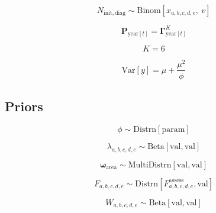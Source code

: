 \documentclass{article}
\begin{document}
\begin{equation}
  \label{eq:model-release}
  N_{\mathrm{init, diag}} \sim \mathrm{Binom} \! \left[ x_{a,b,c,d,e} \mathrm{,} \: v  \right]
\end{equation}

\begin{equation}
  \label{eq:model-movement}
  \boldsymbol{P}_{\mathrm{year}[t]} = \boldsymbol{\Gamma}^{K}_{\mathrm{year}[t]}
\end{equation}

\begin{equation}
  \label{eq:model-seasons}
  K = 6
\end{equation}

\begin{equation}
  \label{eq:model-variance}
  \mathrm{Var} \! \left[ y  \right] = \mu + \frac{\mu^2}{\phi}
\end{equation}

\subsection{Priors}

\begin{equation}
  \label{eq:prior-dispersion}
  \phi \sim \mathrm{Distrn} \! \left[ \mathrm{param} \right]
\end{equation}

\begin{equation}
  \label{eq:prior-selectivity}
  \lambda_{a,b,c,d,e} \sim \mathrm{Beta} \! \left[ \mathrm{val, val} \right]
\end{equation}

\begin{equation}
  \label{eq:prior-weight}
  \boldsymbol{\omega}_{\mathrm{area}} \sim \mathrm{MultiDistrn} \! \left[  \mathrm{val, val} \right]
\end{equation}

\begin{equation}
  \label{eq:prior-fishing}
  F_{a,b,c,d,e} \sim \mathrm{Distrn} \! \left[ F^{\mathrm{assess}}_{a,b,c,d,e} \mathrm{, val} \right]
\end{equation}

\begin{equation}
  \label{eq:prior-reporting}
  W_{a,b,c,d,e} \sim \mathrm{Beta} \! \left[ \mathrm{val, val} \right]
\end{equation}
\end{document}
